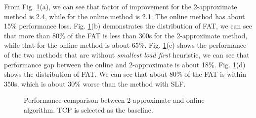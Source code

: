 \documentclass{IEEEtran}
\begin{document}
From Fig. \ref{loss_fig}(a), we can see that factor of improvement for the 2-approximate method is 2.4, while for the online method is 2.1.
The online method has about 15\% performance loss.
Fig. \ref{loss_fig}(b) demonstrates the distribution of FAT, we can see that more than 80\% of the FAT is less than 300s for the 2-approximate method, while that for the online method is about 65\%.
Fig. \ref{loss_fig}(c) shows the performance of the two methods that are without {\em smallest load first} heuristic, we can see that performance gap between the online and 2-approximate is about 18\%. 
Fig. \ref{loss_fig}(d) shows the distribution of FAT. 
We can see that about 80\% of the FAT is within 350s, which is about 30\% worse than the method with SLF. 


\begin{figure}[!t]
\centering
{}
\hspace{0.1in}
\hspace{0.1in}
\hspace{0.1in}
\caption{Performance comparison between 2-approximate and online algorithm. TCP is selected as the baseline.}
\label{loss_fig}
\vspace{-0.1 in}
\end{figure}
\end{document}
